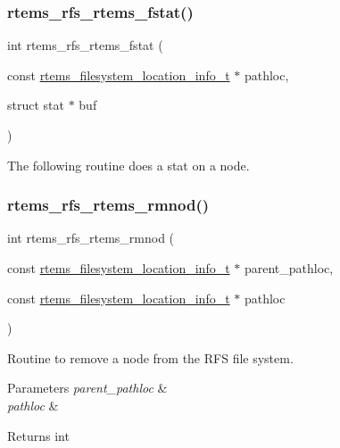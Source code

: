 \subsubsection{\texorpdfstring{rtems\_rfs\_rtems\_fstat()}{rtems\_rfs\_rtems\_fstat()}}
{\footnotesize\ttfamily int rtems\+\_\+rfs\+\_\+rtems\+\_\+fstat (\begin{DoxyParamCaption}\item[{const \mbox{\hyperlink{group__LibIO_ga3252b3d31ee3c49ffff0b7604a676864}{rtems\+\_\+filesystem\+\_\+location\+\_\+info\+\_\+t}} $\ast$}]{pathloc,  }\item[{struct stat $\ast$}]{buf }\end{DoxyParamCaption})}

The following routine does a stat on a node. \mbox{\label{rtems-rfs-rtems_8c_acb8e7e6615d937f61862719b00445978}} 
\subsubsection{\texorpdfstring{rtems\_rfs\_rtems\_rmnod()}{rtems\_rfs\_rtems\_rmnod()}}
{\footnotesize\ttfamily int rtems\+\_\+rfs\+\_\+rtems\+\_\+rmnod (\begin{DoxyParamCaption}\item[{const \mbox{\hyperlink{group__LibIO_ga3252b3d31ee3c49ffff0b7604a676864}{rtems\+\_\+filesystem\+\_\+location\+\_\+info\+\_\+t}} $\ast$}]{parent\+\_\+pathloc,  }\item[{const \mbox{\hyperlink{group__LibIO_ga3252b3d31ee3c49ffff0b7604a676864}{rtems\+\_\+filesystem\+\_\+location\+\_\+info\+\_\+t}} $\ast$}]{pathloc }\end{DoxyParamCaption})}

Routine to remove a node from the R\+FS file system.


\begin{DoxyParams}{Parameters}
{\em parent\+\_\+pathloc} & \\
\hline
{\em pathloc} & \\
\hline
\end{DoxyParams}
\begin{DoxyReturn}{Returns}
int 
\end{DoxyReturn}
\mbox{\label{rtems-rfs-rtems_8c_ad07997e173229e14ef6de4efc1033a5b}} 
